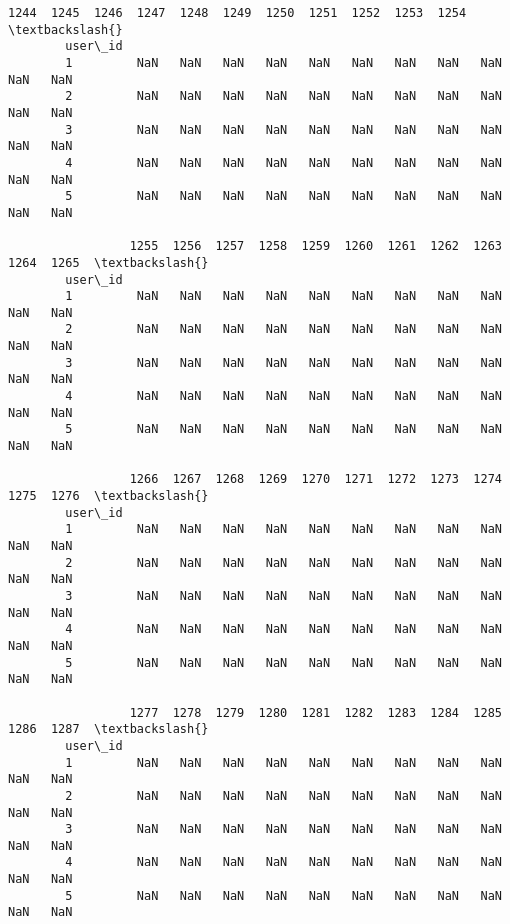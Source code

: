 \documentclass[11pt]{article}
\begin{document}
\begin{Verbatim}[commandchars=\\\{\}]
                 1244  1245  1246  1247  1248  1249  1250  1251  1252  1253  1254  \textbackslash{}
        user\_id                                                                     
        1         NaN   NaN   NaN   NaN   NaN   NaN   NaN   NaN   NaN   NaN   NaN   
        2         NaN   NaN   NaN   NaN   NaN   NaN   NaN   NaN   NaN   NaN   NaN   
        3         NaN   NaN   NaN   NaN   NaN   NaN   NaN   NaN   NaN   NaN   NaN   
        4         NaN   NaN   NaN   NaN   NaN   NaN   NaN   NaN   NaN   NaN   NaN   
        5         NaN   NaN   NaN   NaN   NaN   NaN   NaN   NaN   NaN   NaN   NaN   
        
                 1255  1256  1257  1258  1259  1260  1261  1262  1263  1264  1265  \textbackslash{}
        user\_id                                                                     
        1         NaN   NaN   NaN   NaN   NaN   NaN   NaN   NaN   NaN   NaN   NaN   
        2         NaN   NaN   NaN   NaN   NaN   NaN   NaN   NaN   NaN   NaN   NaN   
        3         NaN   NaN   NaN   NaN   NaN   NaN   NaN   NaN   NaN   NaN   NaN   
        4         NaN   NaN   NaN   NaN   NaN   NaN   NaN   NaN   NaN   NaN   NaN   
        5         NaN   NaN   NaN   NaN   NaN   NaN   NaN   NaN   NaN   NaN   NaN   
        
                 1266  1267  1268  1269  1270  1271  1272  1273  1274  1275  1276  \textbackslash{}
        user\_id                                                                     
        1         NaN   NaN   NaN   NaN   NaN   NaN   NaN   NaN   NaN   NaN   NaN   
        2         NaN   NaN   NaN   NaN   NaN   NaN   NaN   NaN   NaN   NaN   NaN   
        3         NaN   NaN   NaN   NaN   NaN   NaN   NaN   NaN   NaN   NaN   NaN   
        4         NaN   NaN   NaN   NaN   NaN   NaN   NaN   NaN   NaN   NaN   NaN   
        5         NaN   NaN   NaN   NaN   NaN   NaN   NaN   NaN   NaN   NaN   NaN   
        
                 1277  1278  1279  1280  1281  1282  1283  1284  1285  1286  1287  \textbackslash{}
        user\_id                                                                     
        1         NaN   NaN   NaN   NaN   NaN   NaN   NaN   NaN   NaN   NaN   NaN   
        2         NaN   NaN   NaN   NaN   NaN   NaN   NaN   NaN   NaN   NaN   NaN   
        3         NaN   NaN   NaN   NaN   NaN   NaN   NaN   NaN   NaN   NaN   NaN   
        4         NaN   NaN   NaN   NaN   NaN   NaN   NaN   NaN   NaN   NaN   NaN   
        5         NaN   NaN   NaN   NaN   NaN   NaN   NaN   NaN   NaN   NaN   NaN   
        

\end{Verbatim}
\end{document}
